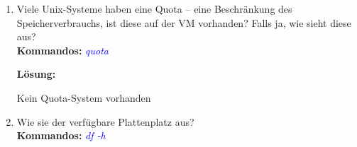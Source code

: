\documentclass[paper=a4,fontsize=11pt]{scrartcl}%
\numberwithin{equation}{section}
\newenvironment{solution}
	{
		\color{blue}
		\textbf{Lösung:}
	}{}
\begin{document}
\begin{enumerate}
\begin{enumerate} [label=(\alph*)]
		\begin{solution}
        \begin{lstlisting}[style=Bash, language=Bash]
#uname nur OS
uname
# OS + Kernel etc
uname -a
freebsd-version
		\end{lstlisting}
		\end{solution}
          \textbf{Kommandos:} \textcolor{blue}{\emph{freebsd-version}, \emph{uname}}
          \item Viele Unix-Systeme haben eine Quota -- eine Beschränkung des Speicherverbrauchs, ist diese auf der VM vorhanden? Falls ja, wie sieht diese aus?\\
          \textbf{Kommandos:} \textcolor{blue}{\emph{quota}}
          
		\begin{solution}
        Kein Quota-System vorhanden
		\end{solution}
          \item Wie sie der verfügbare Plattenplatz aus?\\
          \textbf{Kommandos:} \textcolor{blue}{\emph{df -h}}
          

\end{enumerate}
\end{enumerate}
\end{document}

